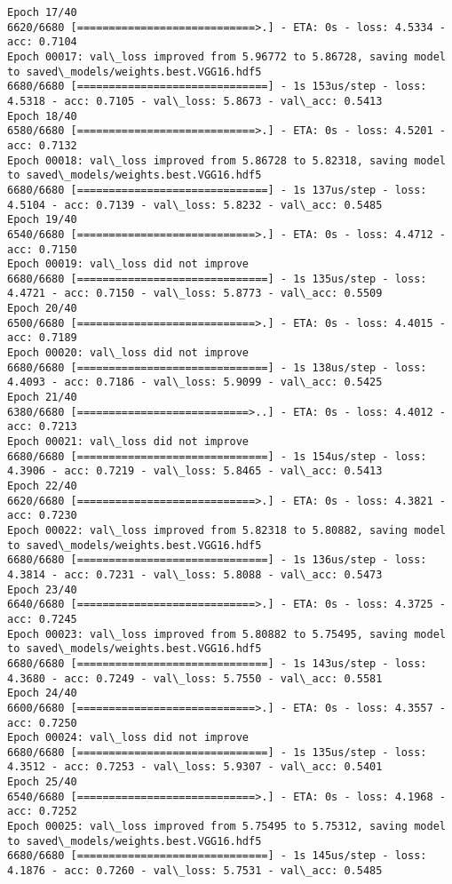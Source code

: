 \documentclass[11pt]{article}
\begin{document}
\begin{Verbatim}[commandchars=\\\{\}]
Epoch 17/40
6620/6680 [============================>.] - ETA: 0s - loss: 4.5334 - acc: 0.7104
Epoch 00017: val\_loss improved from 5.96772 to 5.86728, saving model to saved\_models/weights.best.VGG16.hdf5
6680/6680 [==============================] - 1s 153us/step - loss: 4.5318 - acc: 0.7105 - val\_loss: 5.8673 - val\_acc: 0.5413
Epoch 18/40
6580/6680 [============================>.] - ETA: 0s - loss: 4.5201 - acc: 0.7132
Epoch 00018: val\_loss improved from 5.86728 to 5.82318, saving model to saved\_models/weights.best.VGG16.hdf5
6680/6680 [==============================] - 1s 137us/step - loss: 4.5104 - acc: 0.7139 - val\_loss: 5.8232 - val\_acc: 0.5485
Epoch 19/40
6540/6680 [============================>.] - ETA: 0s - loss: 4.4712 - acc: 0.7150
Epoch 00019: val\_loss did not improve
6680/6680 [==============================] - 1s 135us/step - loss: 4.4721 - acc: 0.7150 - val\_loss: 5.8773 - val\_acc: 0.5509
Epoch 20/40
6500/6680 [============================>.] - ETA: 0s - loss: 4.4015 - acc: 0.7189
Epoch 00020: val\_loss did not improve
6680/6680 [==============================] - 1s 138us/step - loss: 4.4093 - acc: 0.7186 - val\_loss: 5.9099 - val\_acc: 0.5425
Epoch 21/40
6380/6680 [===========================>..] - ETA: 0s - loss: 4.4012 - acc: 0.7213
Epoch 00021: val\_loss did not improve
6680/6680 [==============================] - 1s 154us/step - loss: 4.3906 - acc: 0.7219 - val\_loss: 5.8465 - val\_acc: 0.5413
Epoch 22/40
6620/6680 [============================>.] - ETA: 0s - loss: 4.3821 - acc: 0.7230
Epoch 00022: val\_loss improved from 5.82318 to 5.80882, saving model to saved\_models/weights.best.VGG16.hdf5
6680/6680 [==============================] - 1s 136us/step - loss: 4.3814 - acc: 0.7231 - val\_loss: 5.8088 - val\_acc: 0.5473
Epoch 23/40
6640/6680 [============================>.] - ETA: 0s - loss: 4.3725 - acc: 0.7245
Epoch 00023: val\_loss improved from 5.80882 to 5.75495, saving model to saved\_models/weights.best.VGG16.hdf5
6680/6680 [==============================] - 1s 143us/step - loss: 4.3680 - acc: 0.7249 - val\_loss: 5.7550 - val\_acc: 0.5581
Epoch 24/40
6600/6680 [============================>.] - ETA: 0s - loss: 4.3557 - acc: 0.7250
Epoch 00024: val\_loss did not improve
6680/6680 [==============================] - 1s 135us/step - loss: 4.3512 - acc: 0.7253 - val\_loss: 5.9307 - val\_acc: 0.5401
Epoch 25/40
6540/6680 [============================>.] - ETA: 0s - loss: 4.1968 - acc: 0.7252
Epoch 00025: val\_loss improved from 5.75495 to 5.75312, saving model to saved\_models/weights.best.VGG16.hdf5
6680/6680 [==============================] - 1s 145us/step - loss: 4.1876 - acc: 0.7260 - val\_loss: 5.7531 - val\_acc: 0.5485

\end{Verbatim}
\end{document}
